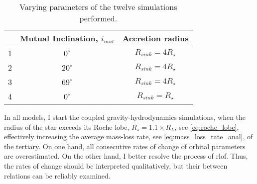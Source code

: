 
\begin{table}[H]
    \centering
    \begin{tabular}{| c | c | c |}
     \hline
     &Mutual Inclination, $i_{mut}$ & Accretion radius \\
    \hline
     1&$0^{\circ}$ & $R_{sink} = 4R_{\star}$\\
     2&$20^{\circ}$ & $R_{sink} = 4R_{\star}$ \\
     3&$69^{\circ}$ & $R_{sink} = 4R_{\star}$ \\
     \hline
     4&$0^{\circ}$ & $R_{sink} = R_{\star}$ \\
     \hline
    \end{tabular}
    \caption{ Varying parameters of the twelve simulations performed.}
\label{tab:simulations_settings}
\end{table}
In all models, I start the coupled gravity-hydrodynamics simulations, when the radius of the star exceeds its Roche lobe, $R_{\star} = 1.1 \times R_L$, see \cref{eq:roche_lobe}, effectively increasing the average mass-loss rate, see \cref{eq:mass_loss_rate_anal}, of the tertiary. On one hand,  all consecutive rates of change of orbital parameters are overestimated. On the other hand, I better resolve the process of \ac{rlof}. Thus, the rates of change should be interpreted qualitatively, but their between relations can be reliably examined.


